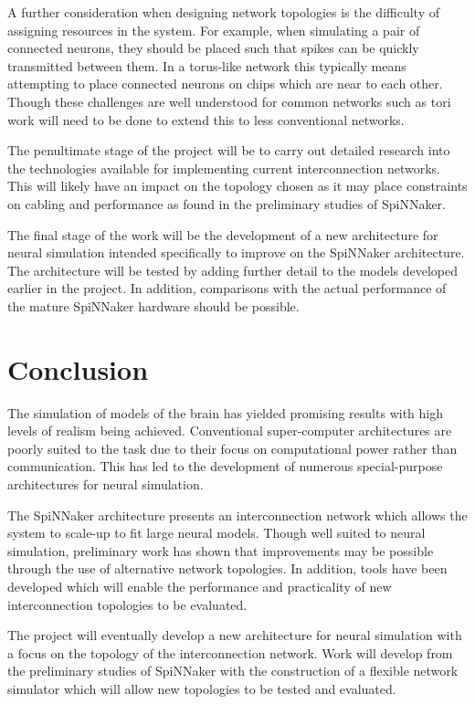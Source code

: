 	A further consideration when designing network topologies is the difficulty of
	assigning resources in the system. For example, when simulating a pair of
	connected neurons, they should be placed such that spikes can be quickly
	transmitted between them. In a torus-like network this typically means
	attempting to place connected neurons on chips which are near to each other.
	Though these challenges are well understood for common networks such as tori
	\cite{dally04} work will need to be done to extend this to less conventional
	networks.
	
	The penultimate stage of the project will be to carry out detailed research
	into the technologies available for implementing current interconnection
	networks. This will likely have an impact on the topology chosen as it may
	place constraints on cabling and performance as found in the preliminary
	studies of SpiNNaker.
	
	The final stage of the work will be the development of a new architecture for
	neural simulation intended specifically to improve on the SpiNNaker
	architecture. The architecture will be tested by adding further detail to the
	models developed earlier in the project. In addition, comparisons with the
	actual performance of the mature SpiNNaker hardware should be possible.

\section{Conclusion}
	
	The simulation of models of the brain has yielded promising results with high
	levels of realism being achieved. Conventional super-computer architectures
	are poorly suited to the task due to their focus on computational power rather
	than communication. This has led to the development of numerous
	special-purpose architectures for neural simulation.
	
	The SpiNNaker architecture presents an interconnection network which allows
	the system to scale-up to fit large neural models. Though well suited to
	neural simulation, preliminary work has shown that improvements may be
	possible through the use of alternative network topologies. In addition, tools
	have been developed which will enable the performance and practicality of new
	interconnection topologies to be evaluated.
	
	The project will eventually develop a new architecture for neural simulation
	with a focus on the topology of the interconnection network. Work will develop
	from the preliminary studies of SpiNNaker with the construction of a flexible
	network simulator which will allow new topologies to be tested and evaluated.
